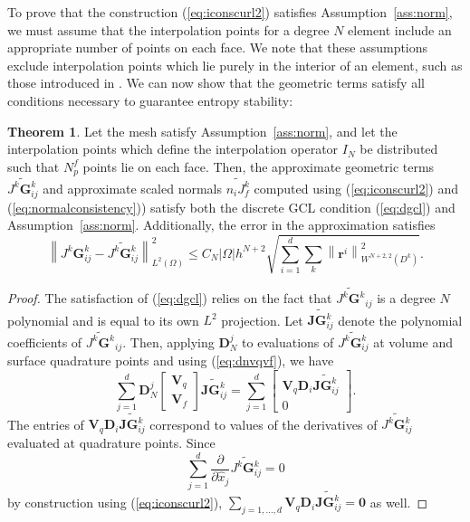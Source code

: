 \documentclass[preprint,10pt]{article}
\theoremstyle{definition}
\theoremstyle{lemma}
\theoremstyle{theorem}
\newtheorem{theorem}{Theorem}
\theoremstyle{assumption}
\renewcommand{\hat}{\widehat}
\renewcommand{\tilde}{\widetilde}
\newcommand{\pd}[2]{\frac{\partial#1}{\partial#2}}
\newcommand{\nor}[1]{\left\| #1 \right\|}
\newcommand{\LRp}[1]{\left( #1 \right)}
\newcommand{\LRs}[1]{\left[ #1 \right]}
\newcommand{\LRb}[1]{\left| #1 \right|}
\begin{document}
{To prove that the construction (\ref{eq:iconscurl2}) satisfies Assumption~\ref{ass:norm}, we must assume that the interpolation points for a degree $N$ element include an appropriate number of points on each face.  We note that these assumptions exclude interpolation points which lie purely in the interior of an element, such as those introduced in \cite{williams2014symmetric,witherden2015identification}.  We can now show that the geometric terms satisfy all conditions necessary to guarantee entropy stability:
\begin{theorem}
Let the mesh satisfy Assumption~\ref{ass:norm}, and let the interpolation points which define the interpolation operator $I_N$ be distributed such that $N^f_p$ points lie on each face. Then, the approximate geometric terms $\tilde{J^k\bm{G}^k_{ij}}$  and approximate scaled normals $\tilde{n_iJ^k_f}$ computed using (\ref{eq:iconscurl2}) and (\ref{eq:normalconsistency})) satisfy both the discrete GCL condition (\ref{eq:dgcl}) and Assumption~\ref{ass:norm}.  Additionally, the error in the approximation satisfies
\[
\nor{{J^k\bm{G}^k_{ij}}-\tilde{J^k\bm{G}^k_{ij}}}_{L^2\LRp{\Omega}}^2  \leq C_N \LRb{\Omega} h^{N+2} \sqrt{\sum_{i=1}^d \sum_k \nor{\bm{r}^i}^2_{W^{N+2,2}\LRp{D^k}}}.
\]
\label{thm:koprivagcl}
\end{theorem}
\begin{proof}
The satisfaction of (\ref{eq:dgcl}) relies on the fact that $\tilde{J^k\bm{G}^k}_{ij}$ is a degree $N$ polynomial and is equal to its own $L^2$ projection.  Let $\tilde{\bm{JG}^k_{ij}}$ denote the polynomial coefficients of $\tilde{J^k\bm{G}^k}_{ij}$.  
Then, applying $\bm{D}^j_N$ to evaluations of $\tilde{J^k\bm{G}^k_{ij}}$ at volume and surface quadrature points and using (\ref{eq:dnvqvf}), we have
\[
\sum_{j=1}^d\bm{D}^j_N \LRs{
\begin{array}{c}
\bm{V}_q\\
\bm{V}_f
\end{array}}
\tilde{\bm{JG}^k_{ij}} = 
\sum_{j=1}^d \LRs{\begin{array}{c}
\bm{V}_q\bm{D}_i\tilde{\bm{JG}^k_{ij}} \\
0
\end{array}}.
\]
The entries of $\bm{V}_q\bm{D}_i\tilde{\bm{JG}^k_{ij}}$ correspond to values of the derivatives of $\tilde{J^k\bm{G}^k_{ij}}$ evaluated at quadrature points.  Since 
\[
\sum_{j=1}^d\pd{}{\hat{x}_j}\tilde{J^k\bm{G}^k_{ij}} = 0
\]
by construction using (\ref{eq:iconscurl2}), $\sum_{j=1,\ldots,d} \bm{V}_q\bm{D}_i\tilde{\bm{JG}^k_{ij}} = \bm{0}$ as well.  


\end{proof}}
\end{document}
